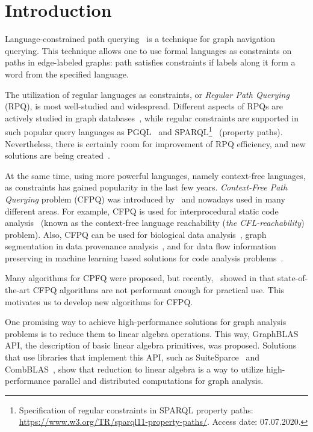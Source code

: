 \section{Introduction}


Language-constrained path querying~\citep{barrett2000formal} is a technique for graph navigation querying.
This technique allows one to use formal languages as constraints on paths in edge-labeled graphs: path satisfies constraints if labels along it form a word from the specified language.

The utilization of regular languages as constraints, or \textit{Regular Path Querying} (RPQ), is most well-studied and widespread.
Different aspects of RPQs are actively studied in graph databases~\citep{10.1145/2463664.2465216, 10.1145/3104031,10.1145/2850413}, while regular constraints are supported in such popular query languages as PGQL~\citep{10.1145/2960414.2960421} and SPARQL\footnote{Specification of regular constraints in SPARQL property paths: \url{https://www.w3.org/TR/sparql11-property-paths/}. Access date: 07.07.2020.}~\citep{10.1007/978-3-319-25007-6_1} (property paths).
Nevertheless, there is certainly room for improvement of RPQ efficiency, and new solutions are being created~\citep{Wang2019,10.1145/2949689.2949711}.

At the same time, using more powerful languages, namely context-free languages, as constraints has gained popularity in the last few years.
\textit{Context-Free Path Querying} problem (CFPQ) was introduced by~\cite{Yannakakis} and nowadays used in many different areas. For example, CFPQ is used for interprocedural static code analysis~\citep{10.1145/3158118,10.5555/271338.271343, YanSCA, Zheng:2008:DAA:1328897.1328464} (known as the context-free language reachability (\textit{the CFL-reachability}) problem). Also, CFPQ can be used for biological data analysis~\citep{GraphQueryWithEarley}, graph segmentation in data provenance analysis~\citep{8731467}, and for data flow information preserving in machine learning based solutions for code analysis problems~\citep{10.1145/3428301}. 

Many algorithms for CPFQ were proposed, but recently,~\cite{Kuijpers:2019:ESC:3335783.3335791} showed in that state-of-the-art CFPQ algorithms are not performant enough for practical use. 
This motivates us to develop new algorithms for CFPQ.

One promising way to achieve high-performance solutions for graph analysis problems is to reduce them to linear algebra operations.
This way, GraphBLAS~\citep{7761646} API, the description of basic linear algebra primitives, was proposed.
Solutions that use libraries that implement this API, such as SuiteSparce~\citep{10.1145/3322125} and CombBLAS~\citep{10.1177/1094342011403516}, show that reduction to linear algebra is a way to utilize high-performance parallel and distributed computations for graph analysis.

